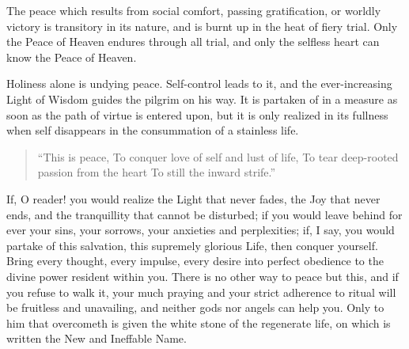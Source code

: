 \documentclass[12pt,oneside]{scrbook}
\begin{document}
  The peace which results from social comfort, passing gratification, or
  worldly victory is transitory in its nature, and is burnt up in the heat
  of fiery trial. Only the Peace of Heaven endures through all trial, and
  only the selfless heart can know the Peace of Heaven.
  
  Holiness alone is undying peace. Self-control leads to it, and the
  ever-increasing Light of Wisdom guides the pilgrim on his way. It is
  partaken of in a measure as soon as the path of virtue is entered upon,
  but it is only realized in its fullness when self disappears in the
  consummation of a stainless life.
  
  \begin{quote}
  ``This is peace, To conquer love of self and lust of life, To tear
  deep-rooted passion from the heart To still the inward strife.''
  \end{quote}
  
  If, O reader! you would realize the Light that never fades, the Joy that
  never ends, and the tranquillity that cannot be disturbed; if you would
  leave behind for ever your sins, your sorrows, your anxieties and
  perplexities; if, I say, you would partake of this salvation, this
  supremely glorious Life, then conquer yourself. Bring every thought,
  every impulse, every desire into perfect obedience to the divine power
  resident within you. There is no other way to peace but this, and if you
  refuse to walk it, your much praying and your strict adherence to ritual
  will be fruitless and unavailing, and neither gods nor angels can help
  you. Only to him that overcometh is given the white stone of the
  regenerate life, on which is written the New and Ineffable Name.
  
\end{document}
